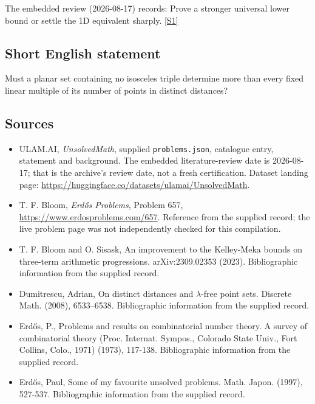 \documentclass[11pt,a4paper]{article}
\newcommand{\sref}[2]{\hyperlink{source:#1:#2}{[S#2]}}
\begin{document}
The embedded review (2026-08-17) records: Prove a stronger universal lower bound or settle the 1D equivalent sharply. \sref{statement}{1}

\subsection{Short English statement}

Must a planar set containing no isosceles triple determine more than every fixed linear multiple of its number of points in distinct distances?

\subsection{Sources}

{\small

\begin{itemize}

\item[\hypertarget{source:statement:1}{S1}] ULAM.AI, \emph{UnsolvedMath}, supplied \texttt{problems.json}, catalogue entry, statement and background. The embedded literature-review date is 2026-08-17; that is the archive’s review date, not a fresh certification. Dataset landing page: \url{https://huggingface.co/datasets/ulamai/UnsolvedMath}.

\item[\hypertarget{source:statement:2}{S2}] T. F. Bloom, \emph{Erdős Problems}, Problem 657, \url{https://www.erdosproblems.com/657}. Reference from the supplied record; the live problem page was not independently checked for this compilation.

\item[\hypertarget{source:statement:3}{S3}] T. F. Bloom and O. Sisask, An improvement to the Kelley-Meka bounds on three-term arithmetic progressions. arXiv:2309.02353 (2023). Bibliographic information from the supplied record.

\item[\hypertarget{source:statement:4}{S4}] Dumitrescu, Adrian, On distinct distances and {$\lambda$}-free point sets. Discrete Math. (2008), 6533--6538. Bibliographic information from the supplied record.

\item[\hypertarget{source:statement:5}{S5}] Erd\H{o}s, P., Problems and results on combinatorial number theory. A survey of combinatorial theory (Proc. Internat. Sympos., Colorado State Univ., Fort Collins, Colo., 1971) (1973), 117-138. Bibliographic information from the supplied record.

\item[\hypertarget{source:statement:6}{S6}] Erd\H{o}s, Paul, Some of my favourite unsolved problems. Math. Japon. (1997), 527-537. Bibliographic information from the supplied record.

\end{itemize}

}

\label{end:statement}
\end{document}
